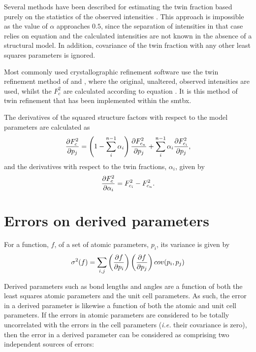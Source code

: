 \documentclass[pdf]{iucr}
\begin{document}
Several methods have been described for estimating the twin fraction based purely on the statistics of the observed intensities \cite{Britton:a08682,Murray-Rust:a10328}. This approach is impossible as the value of $\alpha$ approaches $0.5$, since the separation of intensities in that case relies on equation  and the calculated intensities are not known in the absence of a structural model. In addition, covariance of the twin fraction with any other least squares parameters is ignored.

Most commonly used crystallographic refinement software \cite{Sheldrick:sc5010,Betteridge:os5005} use the twin refinement method of \cite{Jameson:a20747} and \cite{J19710002146}, where the original, unaltered, observed intensities are used, whilst the $F_c^2$ are calculated according to equation . It is this method of twin refinement that has been implemented within the smtbx.

The derivatives of the squared structure factors with respect to the model parameters are calculated as
\begin{equation}
\frac{\partial F_c^2}{\partial p_j} = \left(1-\sum_i^{n-1}{\alpha_i}\right) \frac{\partial F_{c_n}^2}{\partial p_j} + \sum_i^{n-1}{\alpha_i \frac{\partial F_{c_i}^2}{\partial p_j}}
\label{eqn:twin_grads},
\end{equation}
and the derivatives with respect to the twin fractions, $\alpha_i$, given by
\begin{equation}
\frac{\partial F_c^2}{\partial \alpha_i} = F_{c_i}^2 - F_{c_n}^2
\label{eqn:twin_fraction_grads}.
\end{equation}





\section{Errors on derived parameters}
\label{sec:errors}

For a function, $f$, of a set of atomic parameters, $p_i$, its variance is given by \cite{Sands:a05356}
\begin{equation}
\sigma^2(f) = \sum_{i,j}{\left(\frac{\partial f}{\partial p_i}\right) \left(\frac{\partial f}{\partial p_j}\right) cov(p_i,p_j)}
\label{eqn:sigma_f}
\end{equation}

Derived parameters such as bond lengths and angles are a function of both the least squares atomic parameters and the unit cell parameters. As such, the error in a derived parameter is likewise a function of both the atomic and unit cell parameters. If the errors in atomic parameters are considered to be totally uncorrelated with the errors in the cell parameters (\emph{i.e.} their covariance is zero), then the error in a derived parameter can be considered as comprising two independent sources of errors:
\end{document}
